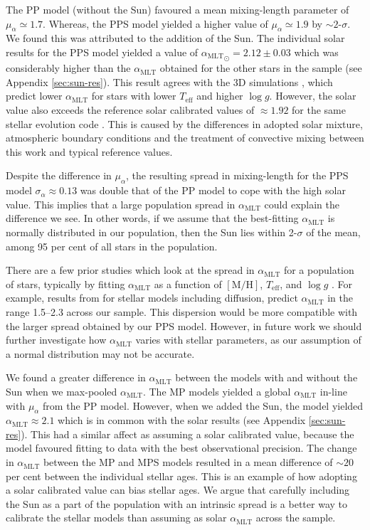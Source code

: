 \documentclass[fleqn,usenatbib]{mnras}
\newcommand{\metallicity}{\ensuremath{[\mathrm{M}/\mathrm{H}]}}
\newcommand{\teff}{\ensuremath{T_\mathrm{eff}}}
\newcommand{\mlt}{\ensuremath{{\alpha_\mathrm{MLT}}}}
\begin{document}
The PP model (without the Sun) favoured a mean mixing-length parameter of $\mu_\alpha \simeq 1.7$. Whereas, the PPS model yielded a higher value of $\mu_\alpha \simeq 1.9$ by $\sim 2$-$\sigma$. We found this was attributed to the addition of the Sun. The individual solar results for the PPS model yielded a value of $\mlt_\odot = 2.12\pm0.03$ which was considerably higher than the $\mlt$ obtained for the other stars in the sample (see Appendix \ref{sec:sun-res}). This result agrees with the 3D simulations \citep[e.g.][]{Trampedach.Stein.ea2014}, which predict lower $\mlt$ for stars with lower $\teff$ and higher $\log g$. However, the solar value also exceeds the reference solar calibrated values of $\approx 1.92$ for the same stellar evolution code \citep{Paxton.Bildsten.ea2011}. This is caused by the differences in adopted solar mixture, atmospheric boundary conditions and the treatment of convective mixing between this work and typical reference values.

Despite the difference in $\mu_\alpha$, the resulting spread in mixing-length for the PPS model $\sigma_\alpha \approx 0.13$ was double that of the PP model to cope with the high solar value. This implies that a large population spread in $\mlt$ could explain the difference we see. In other words, if we assume that the best-fitting $\mlt$ is normally distributed in our population, then the Sun lies within 2-$\sigma$ of the mean, among 95 per cent of all stars in the population. 

There are a few prior studies which look at the spread in $\mlt$ for a population of stars, typically by fitting $\mlt$ as a function of $\metallicity$, $\teff$, and $\log g$ \citep[e.g.][]{Bonaca.Tanner.ea2012,Viani.Basu.ea2018}. For example, results from \citet{Viani.Basu.ea2018} for stellar models including diffusion, predict $\mlt$ in the range \numrange{1.5}{2.3} across our sample. This dispersion would be more compatible with the larger spread obtained by our PPS model. However, in future work we should further investigate how $\mlt$ varies with stellar parameters, as our assumption of a normal distribution may not be accurate.

We found a greater difference in $\mlt$ between the models with and without the Sun when we max-pooled $\mlt$. The MP models yielded a global $\mlt$ in-line with $\mu_\alpha$ from the PP model. However, when we added the Sun, the model yielded $\mlt \approx 2.1$ which is in common with the solar results (see Appendix \ref{sec:sun-res}). This had a similar affect as assuming a solar calibrated value, because the model favoured fitting to data with the best observational precision. The change in $\mlt$ between the MP and MPS models resulted in a mean difference of $\sim 20$ per cent between the individual stellar ages. This is an example of how adopting a solar calibrated value can bias stellar ages. We argue that carefully including the Sun as a part of the population with an intrinsic spread is a better way to calibrate the stellar models than assuming as solar $\mlt$ across the sample.
\end{document}

